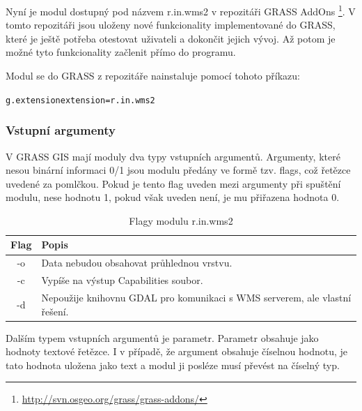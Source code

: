 \documentclass[a4paper,12pt]{article}
\begin{document}
Nyní je modul dostupný pod názvem r.in.wms2 v repozitáři GRASS AddOns \footnote{\url{http://svn.osgeo.org/grass/grass-addons/}}. V tomto repozitáři jsou uloženy nové funkcionality implementované do GRASS, které je ještě potřeba otestovat uživateli a dokončit jejich vývoj. Až potom je možné tyto funkcionality  začlenit přímo do programu. 


Modul se do GRASS z repozitáře nainstaluje pomocí tohoto příkazu:
\begin{alltt}\footnotesize
g.extension extension=r.in.wms2
\end{alltt}

\subsubsection{Vstupní argumenty}

V GRASS GIS mají moduly dva typy vstupních argumentů. Argumenty, které nesou binární informaci 0/1 jsou modulu předány ve formě tzv. flags, což řetězce uvedené za pomlčkou. Pokud je tento flag uveden mezi argumenty při spuštění modulu, nese hodnotu 1, pokud však uveden není, je mu přiřazena hodnota 0. 

\begin{table}[h]
\centering
\begin{tabular}{|c|l|}      \hline
  Flag      &    Popis				\\ \hline
   -o        &  Data nebudou obsahovat průhlednou  vrstvu.\\ \hline
   -c       &  Vypíše na výstup Capabilities soubor.\\ \hline
   -d       &  Nepoužije knihovnu GDAL pro komunikaci s WMS serverem, ale vlastní řešení. \\ \hline
\end{tabular}
\caption{Flagy modulu r.in.wms2}
\label{tab:flagy}
\end{table}

Dalším typem vstupních argumentů je parametr. Parametr obsahuje jako hodnoty textové řetězce. I v případě, že argument obsahuje číselnou hodnotu, je tato hodnota uložena jako text a modul ji posléze musí převést na číselný typ. 
\end{document}
